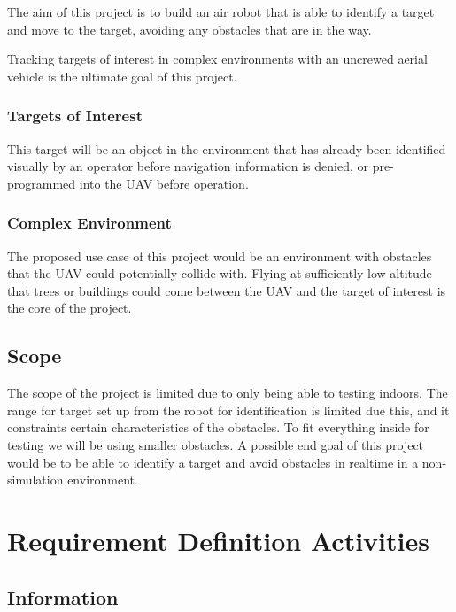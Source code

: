 \documentclass[]{report}
\begin{document}
The aim of this project is to build an air robot that is able to identify a target and move to the target, avoiding any obstacles that are in the way. 

Tracking targets of interest in complex environments with an uncrewed aerial vehicle is the ultimate goal of this project. 

\subsection{Targets of Interest}

This target will be an object in the environment that has already been identified visually by an operator before navigation information is denied, or pre-programmed into the UAV before operation.

\subsection{Complex Environment}

The proposed use case of this project would be an environment with obstacles that the UAV could potentially collide with. Flying at sufficiently low altitude that trees or buildings could come between the UAV and the target of interest is the core of the project.


\section{Scope}
The scope of the project is limited due to only being able to testing indoors. The range for target set up from the robot for identification is limited due this, and it constraints certain characteristics of the obstacles. To fit everything inside for testing we will be using smaller obstacles. A possible end goal of this project would be to be able to identify a target and avoid obstacles in realtime in a non-simulation environment. 

\chapter{Requirement Definition Activities}

\section{Information}
\end{document}
